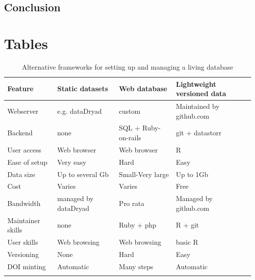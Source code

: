 \documentclass[a4paper,11pt]{article}
\begin{document}
\subsection{Conclusion}



\newpage

\section{Tables}

\begin{table}[h!]
\centering
\caption{Alternative frameworks for setting up and managing a living database}
{\footnotesize
\vspace{1cm}
  \begin{tabular}{p{2.5cm}p{3.5cm}p{3.5cm}p{4cm}}
  \hline
  \textbf{Feature} & \textbf{Static datasets}& \textbf{Web database} & \textbf{Lightweight versioned data}\\
  \hline
   Webserver        & e.g. dataDryad & custom                          &  Maintained by github.com\\
   Backend          & none & SQL + Ruby-on-rails 			& git + datastorr \\
   User access      & Web browser & Web browser 				    & R \\
   Ease of setup    & Very easy & Hard 							& Easy\\ %
   Data size        & Up to several Gb & Small-Very large 				& Up to 1Gb\\
   Cost             & Varies & Varies  						& Free \\
   Bandwidth        &managed by dataDryad & Pro rata 						& Managed by github.com\\
   Maintainer skills &none & Ruby + php 					& R + git \\
   User skills      &Web browsing& Web browsing  					& basic R \\
   Versioning       &None& Hard 							& Easy \\
   DOI minting      &Automatic & Many steps 					& Automatic \\
  \hline 
  \\
 
  \end{tabular}
  } 
\label{tab:sql_v_versioneddata}
\end{table}

\newpage
\end{document}

